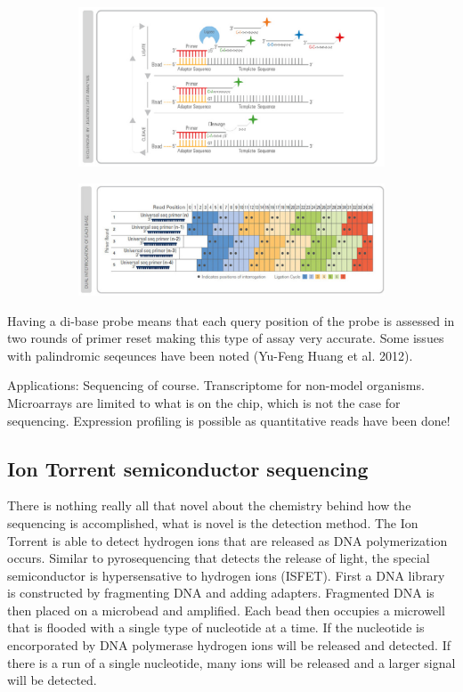 \documentclass{report}\usepackage[]{graphicx}\usepackage[]{color}
\begin{document}
 \begin{figure}[H]
\centering
  \begin{subfigure}[b]{.5\linewidth}
    \centering
    \includegraphics[width=.8\textwidth]{images/SOLiD1.pdf}
  \end{subfigure}%
  \begin{subfigure}[b]{.5\linewidth}
    \centering
    \includegraphics[width=.8\textwidth]{images/SOLiD2.pdf}
  \end{subfigure}%
  \caption{ }\label{fig:SOLiD}
\end{figure}

Having a di-base probe means that each query position of the probe is assessed in two rounds of primer reset making
this type of assay very accurate. Some issues with palindromic seqeunces have been noted (Yu-Feng Huang et al. 2012). 

Applications: Sequencing of course. Transcriptome for non-model organisms. Microarrays are limited to what is on the chip, which is 
not the case for sequencing. Expression profiling is possible as quantitative reads have been done!

\subsection*{Ion Torrent semiconductor sequencing}
There is nothing really all that novel about the chemistry behind how the sequencing is accomplished, 
what is novel is the detection method. The Ion Torrent is able to detect hydrogen ions that are 
released as DNA polymerization occurs. Similar to pyrosequencing that detects the release of light, 
the special semiconductor is hypersensative to hydrogen ions (ISFET). First a DNA library is constructed by 
fragmenting DNA and adding adapters. Fragmented DNA is then placed on a microbead and amplified.
 Each bead then occupies a microwell that is 
flooded with a single type of nucleotide at a time. If the nucleotide is encorporated by DNA polymerase
hydrogen ions will be released and detected. If there is a run of a single nucleotide, many ions will 
be released and a larger signal will be detected. 
\end{document}
